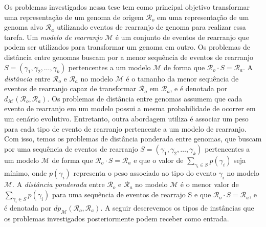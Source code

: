 Os problemas investigados nessa tese tem como principal objetivo transformar uma representação de um genoma de origem $\mathcal{R}_{o}$ em uma representação de um genoma alvo $\mathcal{R}_{a}$ utilizando eventos de rearranjo de genoma para realizar essa tarefa. Um \emph{modelo de rearranjo} $\mathcal{M}$ é um conjunto de eventos de rearranjo que podem ser utilizados para transformar um genoma em outro. Os problemas de distância entre genomas buscam por a menor sequência de eventos de rearranjo $S=(\gamma_1, \gamma_2, \dots, \gamma_k)$ pertencentes a um modelo $\mathcal{M}$ de forma que $\mathcal{R}_{o} \cdot S = \mathcal{R}_{a}$. A \emph{distância} entre $\mathcal{R}_{o}$ e $\mathcal{R}_{a}$ no modelo $\mathcal{M}$ é o tamanho da menor sequência de eventos de rearranjo capaz de transformar $\mathcal{R}_{o}$ em $\mathcal{R}_{a}$, e é denotada por $d_{\mathcal{M}}(\mathcal{R}_{o},\mathcal{R}_{a})$. Os problemas de distância entre genomas assumem que cada evento de rearranjo em um modelo possui a mesma probabilidade de ocorrer em um cenário evolutivo. Entretanto, outra abordagem utiliza é associar um peso para cada tipo de evento de rearranjo pertencente a um modelo de rearranjo. Com isso, temos os problemas de distância ponderada entre genomas, que buscam por uma sequência de eventos de rearranjo $S=(\gamma_1, \gamma_2, \dots, \gamma_k)$ pertencentes a um modelo $\mathcal{M}$ de forma que $\mathcal{R}_{o} \cdot S = \mathcal{R}_{a}$ e que o valor de $\sum_{\gamma_i \in S} p(\gamma_i)$ seja mínimo, onde $p(\gamma_i)$ representa o peso associado ao tipo do evento $\gamma_i$ no modelo $\mathcal{M}$. A \emph{distância ponderada} entre $\mathcal{R}_{o}$ e $\mathcal{R}_{a}$ no modelo $\mathcal{M}$ é o menor valor de $\sum_{\gamma_i \in S} p(\gamma_i)$ para uma sequência de eventos de rearrajo S e que $\mathcal{R}_{o} \cdot S = \mathcal{R}_{a}$, e é denotada por $dp_{\mathcal{M}}(\mathcal{R}_{o},\mathcal{R}_{a})$. A seguir descrevemos os tipos de instâncias que os problemas investigados posteriormente podem receber como entrada.

